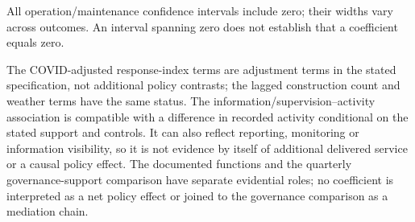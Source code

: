 All operation/maintenance confidence intervals include zero; their widths vary
across outcomes.  An interval spanning zero does not establish that a coefficient equals zero.

The COVID-adjusted response-index terms are adjustment terms in the stated
specification, not additional policy contrasts; the lagged construction count
and weather terms have the same status.  The information/supervision--activity
association is compatible with a difference in recorded activity conditional on
the stated support and controls.  It can also reflect reporting, monitoring or
information visibility, so it is not evidence by itself of additional delivered
service or a causal policy effect.  The documented functions and the quarterly
governance-support comparison have separate evidential roles; no coefficient is
interpreted as a net policy effect or joined to the governance comparison as a
mediation chain.

